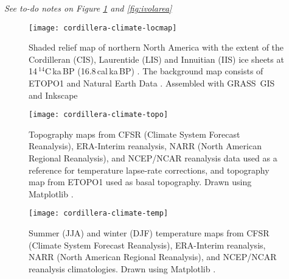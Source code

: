 
\emph{See to-do notes on Figure \ref{fig:locmap}
and \ref{fig:ivolarea}
}

\begin{figure}[t]
	\vspace*{2mm}
	\begin{center}
		\texttt{[image: cordillera-climate-locmap]}
	\end{center}
	\caption{Shaded relief map of northern North America with the extent of the Cordilleran (CIS), Laurentide (LIS) and Innuitian (IIS) ice sheets at 14\,$^{14}$C\,ka\,BP (16.8\,cal\,ka\,BP) \citep{dyke-2004}. The background map consists of ETOPO1 \citep{data:etopo1} and Natural Earth Data \citep{data:naturalearth}. Assembled with GRASS~GIS \citep{soft:grass} and Inkscape \citep{web:inkscape}}
	\label{fig:locmap}
\end{figure}

\begin{figure*}[t]
	\vspace*{2mm}
	\begin{center}
		\texttt{[image: cordillera-climate-topo]}
	\end{center}
	\caption{Topography maps from CFSR (Climate System Forecast Reanalysis), ERA-Interim reanalysis, NARR (North American Regional Reanalysis), and NCEP/NCAR reanalysis data used as a reference for temperature lapse-rate corrections, and topography map from ETOPO1 used as basal topography. Drawn using Matplotlib \citep{soft:mpl}.}
	\label{fig:topo}
\end{figure*}

\begin{figure*}[t]
	\vspace*{2mm}
	\begin{center}
		\texttt{[image: cordillera-climate-temp]}
	\end{center}
	\caption{Summer (JJA) and winter (DJF) temperature maps from CFSR (Climate System Forecast Reanalysis), ERA-Interim reanalysis, NARR (North American Regional Reanalysis), and NCEP/NCAR reanalysis climatologies. Drawn using Matplotlib \citep{soft:mpl}.}
	\label{fig:temp}
\end{figure*}

